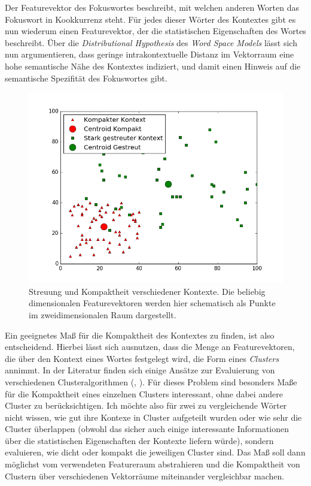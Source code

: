\documentclass[11pt,numbers=noenddot]{scrartcl}
\begin{document}
Der Featurevektor des Fokuswortes beschreibt, mit welchen anderen Worten das Fokuswort in Kookkurrenz steht. Für jedes dieser Wörter des Kontextes gibt es nun wiederum einen Featurevektor, der die statistischen Eigenschaften des Wortes beschreibt. Über die \emph{Distributional Hypothesis} des \emph{Word Space Models} lässt sich nun argumentieren, dass geringe intrakontextuelle Distanz im Vektorraum eine hohe semantische Nähe des Kontextes indiziert, und damit einen Hinweis auf die semantische Spezifität des Fokuswortes gibt.

\begin{figure}
    \includegraphics[width = \textwidth]{kontext}
    \caption{Streuung und Kompaktheit verschiedener Kontexte. Die beliebig dimensionalen Featurevektoren werden hier schematisch als Punkte im zweidimensionalen Raum dargestellt.}
    \label{kontext}
\end{figure}

Ein geeignetes Maß für die Kompaktheit des Kontextes zu finden, ist also entscheidend. Hierbei lässt sich ausnutzen, dass die Menge an Featurevektoren, die über den Kontext eines Wortes festgelegt wird, die Form eines \emph{Clusters} annimmt. In der Literatur finden sich einige Ansätze zur Evaluierung von verschiedenen Clusteralgorithmen (\citet{dunn1974}, \citet{Halkidi2001}). Für dieses Problem sind besonders Maße für die Kompaktheit eines einzelnen Clusters interessant, ohne dabei andere Cluster zu berücksichtigen. Ich möchte also für zwei zu vergleichende Wörter nicht wissen, wie gut ihre Kontexe in Cluster aufgeteilt wurden oder wie sehr die Cluster überlappen (obwohl das sicher auch einige interessante Informationen über die statistischen Eigenschaften der Kontexte liefern würde), sondern evaluieren, wie dicht oder kompakt die jeweiligen Cluster sind. Das Maß soll dann möglichst vom verwendeten Featureraum abstrahieren und die Kompaktheit von Clustern über verschiedenen Vektorräume miteinander vergleichbar machen.
\end{document}

